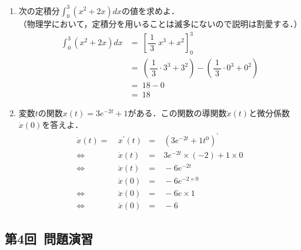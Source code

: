 \documentclass[a4paper,11pt]{ltjsarticle}
\begin{document}
\begin{enumerate}
  \item 次の定積分$\displaystyle{\int_0^3(x^{2}+2x)dx}$の値を求めよ．\\
  （物理学において，定積分を用いることは滅多にないので説明は割愛する．）
  \begin{equation*}
    \begin{aligned}
      \int_0^3(x^{2}+2x)dx &=\ \left[\dfrac{1}{\ 3\ }\ x^{3}+x^{2} \right]_0^3 \\
                           &=\ \left(\dfrac{1}{\ 3\ } \cdot 3^{3} + 3^{2}\right)-\left(\dfrac{1}{\ 3\ } \cdot 0^{3} + 0^{2}\right) \\
                           &=\ 18-0 \\
                           &=\ 18
    \end{aligned}
  \end{equation*}
  \item 変数$t$の関数$x(t)=3e^{-2t}+1$がある．この関数の導関数$\dot{x}(t)$と微分係数$\dot{x}(0)$を答えよ．
  \begin{equation*}
    \begin{aligned}
          \dot{x}(t)=\ & x^{\prime}(t) &=&\ (3e^{-2t}+1t^{0})^{\prime} \\
      \Leftrightarrow\ & \dot{x}(t)    &=&\ 3e^{-2t} \times (-2) +1 \times 0 \\
      \Leftrightarrow\ & \dot{x}(t)    &=&\ -6e^{-2t} \\
                       & \dot{x}(0)    &=&\ -6e^{-2 \times 0} \\
      \Leftrightarrow\ & \dot{x}(0)    &=&\ -6e \times 1 \\
      \Leftrightarrow\ & \dot{x}(0)    &=&\ -6
    \end{aligned}
  \end{equation*}
\end{enumerate}

\subsection{第4回\ 問題演習}
\end{document}

